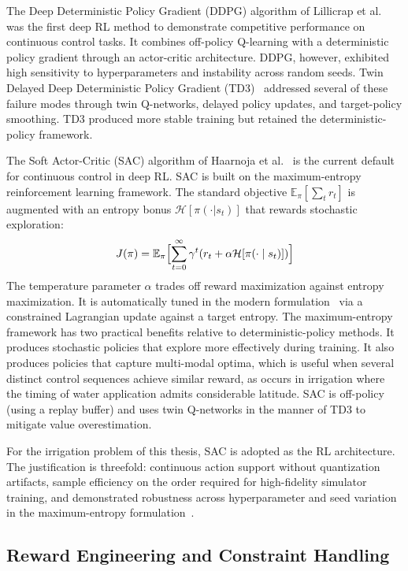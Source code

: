 The Deep Deterministic Policy Gradient (DDPG) algorithm of Lillicrap
et al.~\cite{lillicrap2015ddpg} was the first deep RL method to
demonstrate competitive performance on continuous control tasks. It
combines off-policy Q-learning with a deterministic policy gradient
through an actor-critic architecture. DDPG, however, exhibited high
sensitivity to hyperparameters and instability across random seeds.
Twin Delayed Deep Deterministic Policy Gradient
(TD3)~\cite{fujimoto2018td3} addressed several of these failure modes
through twin Q-networks, delayed policy updates, and target-policy
smoothing. TD3 produced more stable training but retained the
deterministic-policy framework.

The Soft Actor-Critic (SAC) algorithm of Haarnoja et
al.~\cite{haarnoja2018sac,haarnoja2019sac} is the current default
for continuous control in deep RL. SAC is built on the
maximum-entropy reinforcement learning framework. The standard
objective $\mathbb{E}_\pi[\sum_t r_t]$ is augmented with an entropy
bonus $\mathcal{H}[\pi(\cdot|s_t)]$ that rewards stochastic
exploration:
\begin{equation}
J(\pi) = \mathbb{E}_\pi\Bigl[\sum_{t=0}^{\infty} \gamma^t
(r_t + \alpha \mathcal{H}[\pi(\cdot \mid s_t)])\Bigr]
\label{eq:sac-objective}
\end{equation}
The temperature parameter $\alpha$ trades off reward maximization
against entropy maximization. It is automatically tuned in the modern
formulation~\cite{haarnoja2019sac} via a constrained Lagrangian update
against a target entropy. The maximum-entropy framework has two
practical benefits relative to deterministic-policy methods. It
produces stochastic policies that explore more effectively during
training. It also produces policies that capture multi-modal optima,
which is useful when several distinct control sequences achieve
similar reward, as occurs in irrigation where the timing of water
application admits considerable latitude. SAC is off-policy (using a
replay buffer) and uses twin Q-networks in the manner of TD3 to
mitigate value overestimation.

For the irrigation problem of this thesis, SAC is adopted as the RL
architecture. The justification is threefold: continuous action
support without quantization artifacts, sample efficiency on the
order required for high-fidelity simulator training, and demonstrated
robustness across hyperparameter and seed variation in the
maximum-entropy formulation~\cite{haarnoja2019sac}.

\subsection{Reward Engineering and Constraint Handling}
\label{ssec:lit-rl-reward}

